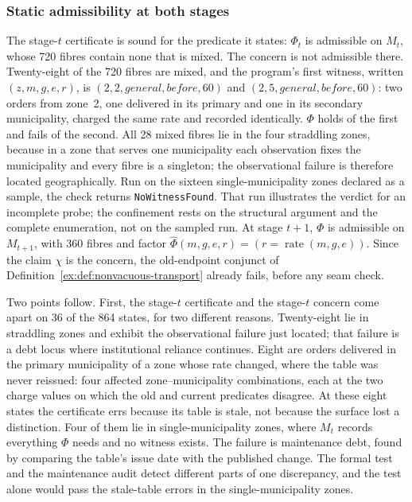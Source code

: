 \documentclass[11pt]{article}
\theoremstyle{definition}
\newcommand{\code}[1]{\texttt{#1}}
\begin{document}
\subsubsection{Static admissibility at both stages}

The stage-$t$ certificate is sound for the predicate it states: $\Phi_t$ is admissible on $M_t$, whose 720 fibres contain none that is mixed. The concern is not admissible there. Twenty-eight of the 720 fibres are mixed, and the program's first witness, written $(z,m,g,e,r)$, is $(2,2,\mathit{general},\mathit{before},60)$ and $(2,5,\mathit{general},\mathit{before},60)$: two orders from zone~2, one delivered in its primary and one in its secondary municipality, charged the same rate and recorded identically. $\Phi$ holds of the first and fails of the second. All 28 mixed fibres lie in the four straddling zones, because in a zone that serves one municipality each observation fixes the municipality and every fibre is a singleton; the observational failure is therefore located geographically. Run on the sixteen single-municipality zones declared as a sample, the check returns \code{NoWitnessFound}. That run illustrates the verdict for an incomplete probe; the confinement rests on the structural argument and the complete enumeration, not on the sampled run. At stage $t+1$, $\Phi$ is admissible on $M_{t+1}$, with 360 fibres and factor $\widehat\Phi(m,g,e,r)=(r=\operatorname{rate}(m,g,e))$. Since the claim $\chi$ is the concern, the old-endpoint conjunct of Definition~\ref{ex:def:nonvacuous-transport} already fails, before any seam check.

Two points follow. First, the stage-$t$ certificate and the stage-$t$ concern come apart on 36 of the 864 states, for two different reasons. Twenty-eight lie in straddling zones and exhibit the observational failure just located; that failure is a debt locus where institutional reliance continues. Eight are orders delivered in the primary municipality of a zone whose rate changed, where the table was never reissued: four affected zone--municipality combinations, each at the two charge values on which the old and current predicates disagree. At these eight states the certificate errs because its table is stale, not because the surface lost a distinction. Four of them lie in single-municipality zones, where $M_t$ records everything $\Phi$ needs and no witness exists. The failure is maintenance debt, found by comparing the table's issue date with the published change. The formal test and the maintenance audit detect different parts of one discrepancy, and the test alone would pass the stale-table errors in the single-municipality zones.
\end{document}
